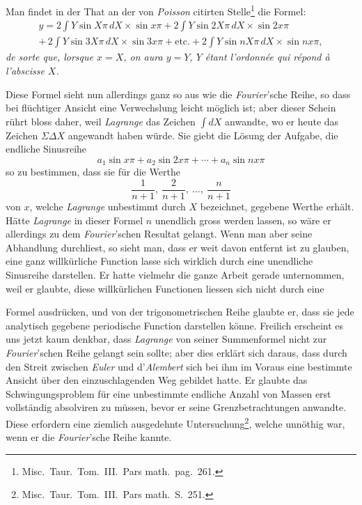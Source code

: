 \documentclass[12pt,a4paper]{article}
\begin{document}
Man findet in der That an der von \textit{Poisson} citirten Stelle\footnote{Misc.\ Taur.\ Tom.~III.\ Pars math.\ pag.~261.} die Formel:
\begin{multline*}
y = 2\!\int\! Y\sin X\pi\,dX \times \sin x\pi + 2\!\int\! Y\sin 2X\pi\,dX \times \sin 2x\pi\\
+\, 2\!\int\! Y\sin 3X\pi\,dX \times \sin 3x\pi + \text{etc.} + 2\!\int\! Y\sin nX\pi\,dX \times \sin nx\pi,
\end{multline*}
\textit{de sorte que, lorsque $x = X$, on aura $y = Y$, $Y$ étant l'ordonnée qui répond à l'abscisse $X$.}

Diese Formel sieht nun allerdings ganz so aus wie die \textit{Fourier}'sche Reihe, so dass bei flüchtiger Ansicht eine Verwechslung leicht möglich ist; aber dieser Schein rührt bloss daher, weil \textit{Lagrange} das Zeichen $\int\!dX$ anwandte, wo er heute das Zeichen $\Sigma\Delta X$ angewandt haben würde. Sie giebt die Lösung der Aufgabe, die endliche Sinusreihe
\[ a_1\sin x\pi + a_2\sin 2x\pi + \cdots + a_n\sin nx\pi \]
so zu bestimmen, dass sie für die Werthe
\[ \frac{1}{n+1},\ \frac{2}{n+1},\ \ldots,\ \frac{n}{n+1} \]
von $x$, welche \textit{Lagrange} unbestimmt durch $X$ bezeichnet, gegebene Werthe erhält. Hätte \textit{Lagrange} in dieser Formel $n$ unendlich gross werden lassen, so wäre er allerdings zu dem \textit{Fourier}'schen Resultat gelangt. Wenn man aber seine Abhandlung durchliest, so sieht man, dass er weit davon entfernt ist zu glauben, eine ganz willkürliche Function lasse sich wirklich durch eine unendliche Sinusreihe darstellen. Er hatte vielmehr die ganze Arbeit gerade unternommen, weil er glaubte, diese willkürlichen Functionen liessen sich nicht durch eine

\newpage

Formel ausdrücken, und von der trigonometrischen Reihe glaubte er, dass sie jede analytisch gegebene periodische Function darstellen könne. Freilich erscheint es uns jetzt kaum denkbar, dass \textit{Lagrange} von seiner Summenformel nicht zur \textit{Fourier}'schen Reihe gelangt sein sollte; aber dies erklärt sich daraus, dass durch den Streit zwischen \textit{Euler} und d'\textit{Alembert} sich bei ihm im Voraus eine bestimmte Ansicht über den einzuschlagenden Weg gebildet hatte. Er glaubte das Schwingungsproblem für eine unbestimmte endliche Anzahl von Massen erst vollständig absolviren zu müssen, bevor er seine Grenzbetrachtungen anwandte. Diese erfordern eine ziemlich ausgedehnte Untersuchung\footnote{Misc.\ Taur.\ Tom.~III.\ Pars math.\ S.~251.}, welche unnöthig war, wenn er die \textit{Fourier}'sche Reihe kannte.
\end{document}
